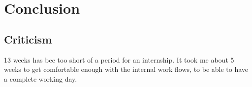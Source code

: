 \documentclass[11pt,a4paper,UKenglish]{article}
\begin{document}
\section{Conclusion}


\subsection{Criticism}
13 weeks has bee too short of a period for an internship. It took me about 5 weeks to get comfortable enough with the internal work flows, to be able to have a complete working day.



\appendix %



\end{document}
